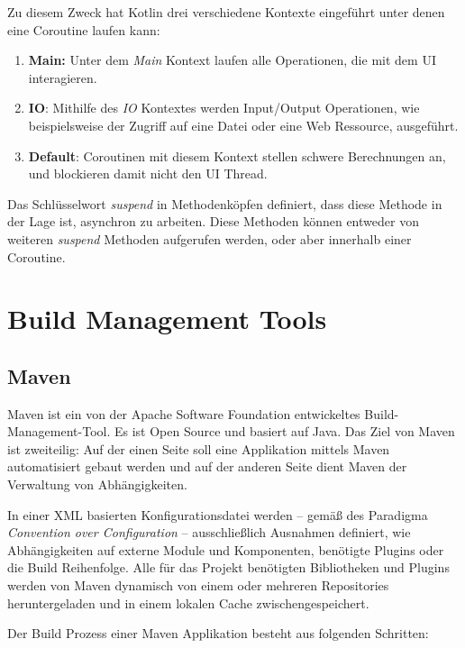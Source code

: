 				Zu diesem Zweck hat Kotlin drei verschiedene Kontexte eingeführt unter denen eine Coroutine laufen kann:
				
				\begin{enumerate}
					\item 
						\textbf{Main:} Unter dem \textit{Main} Kontext laufen alle Operationen, die mit dem \acs{UI} interagieren. 
					\item 
						\textbf{IO}: Mithilfe des \textit{\acs{IO}} Kontextes werden Input/Output Operationen, wie beispielsweise der Zugriff auf eine Datei oder eine Web Ressource, ausgeführt.
					\item 
						\textbf{Default}: Coroutinen mit diesem Kontext stellen schwere Berechnungen an, und blockieren damit nicht den \acs{UI} Thread.
				\end{enumerate}
				
				Das Schlüsselwort \textit{suspend} in Methodenköpfen definiert, dass diese Methode in der Lage ist, asynchron zu arbeiten. Diese Methoden können entweder von weiteren \textit{suspend} Methoden aufgerufen werden, oder aber innerhalb einer Coroutine.
				
	\section{Build Management Tools}\label{sec:QM} %
	
		\subsection{Maven} %
			
			 Maven ist ein von der Apache Software Foundation entwickeltes Build-Management-Tool. Es ist Open Source und basiert auf Java. Das Ziel von Maven ist zweiteilig: Auf der einen Seite soll eine Applikation mittels Maven automatisiert gebaut werden und auf der anderen Seite dient Maven der Verwaltung von Abhängigkeiten. 
			 
			 In einer XML basierten Konfigurationsdatei werden -- gemäß des Paradigma \textit{Convention over Configuration} -- ausschließlich Ausnahmen definiert, wie Abhängigkeiten auf externe Module und Komponenten, benötigte Plugins oder die Build Reihenfolge. Alle für das Projekt benötigten Bibliotheken und Plugins werden von Maven dynamisch von einem oder mehreren Repositories heruntergeladen und in einem lokalen Cache zwischengespeichert. \cite{Company.2009}
			 
			 Der Build Prozess einer Maven Applikation besteht aus folgenden Schritten:
			 
